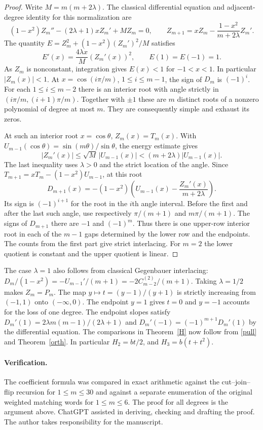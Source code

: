 \documentclass[11pt]{article}
\begin{document}
\begin{proof}
Write $M=m(m+2\lambda)$. The classical differential equation and adjacent-degree identity for this normalization are \cite[\S\S18.8--18.9]{dlmf}
\[
 (1-x^2)Z_m''-(2\lambda+1)xZ_m'+MZ_m=0,\qquad
 Z_{m+1}=x Z_m-\frac{1-x^2}{m+2\lambda} Z_m'.
\]
The quantity $E=Z_m^2+(1-x^2)(Z_m')^2/M$ satisfies
\[
 E'(x)=\frac{4\lambda x}{M}(Z_m'(x))^2,\qquad E(1)=E(-1)=1 .
\]
As $Z_m$ is nonconstant, integration gives $E(x)<1$ for $-1<x<1$. In particular $|Z_m(x)|<1$. At $x=\cos(i\pi/m)$, $1\le i\le m-1$, the sign of $D_m$ is $(-1)^i$. For each $1\le i\le m-2$ there is an interior root with angle strictly in $(i\pi/m,(i+1)\pi/m)$. Together with $\pm1$ these are $m$ distinct roots of a nonzero polynomial of degree at most $m$. They are consequently simple and exhaust its zeros.

At such an interior root $x=\cos\theta$, $Z_m(x)=T_m(x)$. With $U_{m-1}(\cos\theta)=\sin(m\theta)/\sin\theta$, the energy estimate gives
\[
 |Z_m'(x)|\le \sqrt{M}\,|U_{m-1}(x)| < (m+2\lambda)|U_{m-1}(x)|.
\]
The last inequality uses $\lambda>0$ and the strict location of the angle. Since $T_{m+1}=xT_m-(1-x^2)U_{m-1}$, at this root
\[
 D_{m+1}(x)=-(1-x^2)\left(U_{m-1}(x)-\frac{Z_m'(x)}{m+2\lambda}\right).
\]
Its sign is $(-1)^{i+1}$ for the root in the $i$th angle interval. Before the first and after the last such angle, use respectively $\pi/(m+1)$ and $m\pi/(m+1)$. The signs of $D_{m+1}$ there are $-1$ and $(-1)^m$. Thus there is one upper-row interior root in each of the $m-1$ gaps determined by the lower row and the endpoints. The counts from the first part give strict interlacing. For $m=2$ the lower quotient is constant and the upper quotient is linear.
\end{proof}

The case $\lambda=1$ also follows from classical Gegenbauer interlacing:
$D_m/(1-x^2)=-U_{m-1}'/(m+1)=-2C_{m-2}^{(2)}/(m+1)$.
Taking $\lambda=1/2$ makes $Z_m=P_m$. The map $y\mapsto t=(y-1)/(y+1)$ is strictly increasing from $(-1,1)$ onto $(-\infty,0)$. The endpoint $y=1$ gives $t=0$ and $y=-1$ accounts for the loss of one degree. The endpoint slopes satisfy $D_m'(1)=2\lambda m(m-1)/(2\lambda+1)$ and $D_m'(-1)=(-1)^{m+1}D_m'(1)$ by the differential equation. The comparisons in Theorem~\ref{H} now follow from \eqref{pull} and Theorem~\ref{orth}. In particular $H_2=bt/2$, and $H_3=b(t+t^2)$.

\paragraph{Verification.}
The coefficient formula was compared in exact arithmetic against the cut--join--flip recursion for $1\le m\le30$ and against a separate enumeration of the original weighted matching words for $1\le m\le6$. The proof for all degrees is the argument above. ChatGPT assisted in deriving, checking and drafting the proof. The author takes responsibility for the manuscript.
\end{document}
